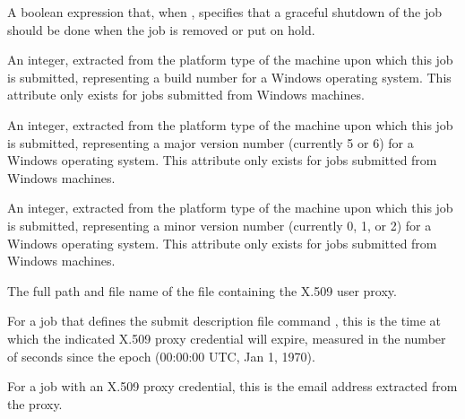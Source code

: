 \begin{description}
\item[\AdAttr{WantGracefulRemoval}:] A boolean expression that,
when , specifies that a graceful shutdown of the job
should be done when the job is removed or put on hold.

\item[\AdAttr{WindowsBuildNumber}:] An integer, extracted from the
platform type of the machine upon which this job is submitted,
representing a build number for a Windows operating system.
This attribute only exists for jobs submitted from Windows machines.

\item[\AdAttr{WindowsMajorVersion}:] An integer, extracted from the
platform type of the machine upon which this job is submitted,
representing a major version number (currently 5 or 6)
for a Windows operating system.
This attribute only exists for jobs submitted from Windows machines.

\item[\AdAttr{WindowsMinorVersion}:] An integer, extracted from the
platform type of the machine upon which this job is submitted, 
representing a minor version number (currently 0, 1, or 2)
for a Windows operating system.
This attribute only exists for jobs submitted from Windows machines.

\item[\AdAttr{X509UserProxy}:]   
The full path and file name of the file containing the X.509 user proxy.

\item[\AdAttr{X509UserProxyExpiration}:]   
For a job that defines the submit description file command
, this is the time at which the indicated
X.509 proxy credential will expire, measured in the
number of seconds since the epoch (00:00:00 UTC, Jan 1, 1970).

\item[\AdAttr{X509UserProxyEmail}:]   
\item For a job with an X.509 proxy credential, this is the email
address extracted from the proxy.


\end{description}

